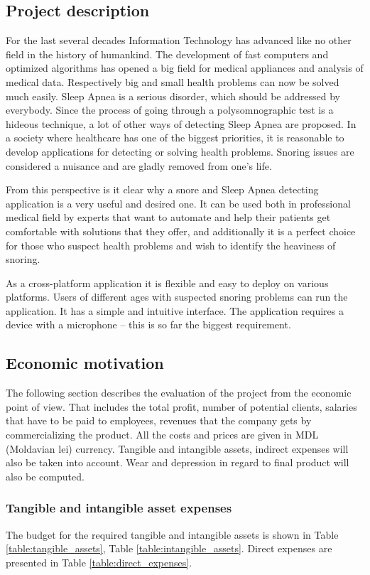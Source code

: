 \subsection{Project description}
For the last several decades Information Technology has advanced like no other field in the history of humankind. The development of fast computers and optimized algorithms has opened a big field for medical appliances and analysis of medical data. Respectively big and small health problems can now be solved much easily. Sleep Apnea is a serious disorder, which should be addressed by everybody. Since the process of going through a polysomnographic test is a hideous technique, a lot of other ways of detecting Sleep Apnea are proposed. In a society where healthcare has one of the biggest priorities, it is reasonable to develop applications for detecting or solving health problems. Snoring issues are considered a nuisance and are gladly removed from one's life.

From this perspective is it clear why a snore and Sleep Apnea detecting application is a very useful and desired one. It can be used both in professional medical field by experts that want to automate and help their patients get comfortable with solutions that they offer, and additionally it is a perfect choice for those who suspect health problems and wish to identify the heaviness of snoring. 

As a cross-platform application it is flexible and easy to deploy on various platforms. Users of different ages with suspected snoring problems can run the application. It has a simple and intuitive interface. The application requires a device with a microphone -- this is so far the biggest requirement.

\subsection{Economic motivation}
The following section describes the evaluation of the project from the economic point of view. That includes the total profit, number of potential clients, salaries that have to be paid to employees, revenues that the company gets by commercializing the product. All the costs and prices are given in MDL (Moldavian lei) currency. Tangible and intangible assets, indirect expenses will also be taken into account. Wear and depression in regard to final product will also be computed.

\subsubsection{Tangible and intangible asset expenses}
The budget for the required tangible and intangible assets is shown in Table \ref{table:tangible_assets}, Table \ref{table:intangible_assets}. Direct expenses are presented in Table \ref{table:direct_expenses}.

